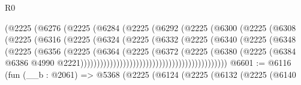 \begin{lexlean}{R0}
\begin{coremodule}
                                  (@2225
                                    (@6276
                                      (@2225
                                        (@6284
                                          (@2225
                                            (@6292
                                              (@2225
                                                (@6300
                                                  (@2225
                                                    (@6308
                                                      (@2225
                                                        (@6316
                                                          (@2225
                                                            (@6324
                                                              (@2225
                                                                (@6332
                                                                  (@2225
                                                                    (@6340
                                                                      (@2225
                                                                        (@6348
                                                                          (@2225
                                                                            (@6356
                                                                              (@2225
                                                                                (@6364
                                                                                  (@2225
                                                                                    (@6372
                                                                                      (@2225
                                                                                        (@6380
                                                                                          (@2225
                                                                                            (@6384
                                                                                              @6386
                                                                                              @4990
                                                                                              @2221)))))))))))))))))))))))))))))))))))))))))))))
@6601 := @6116
    (fun (__b : @2061) =>
    @5368
      (@2225
        (@6124
          (@2225
            (@6132
              (@2225
                (@6140

\end{coremodule}
\end{lexlean}
